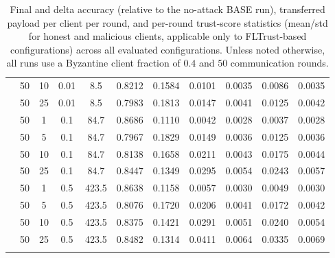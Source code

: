 \begin{longtable}{@{}l c c c c c c c c c c@{}}
	& 50 & 10 & 0.01 & 8.5 & 0.8212 & 0.1584 & 0.0101 & 0.0035 & 0.0086 & 0.0035 \\
	& 50 & 25 & 0.01 & 8.5 & 0.7983 & 0.1813 & 0.0147 & 0.0041 & 0.0125 & 0.0042 \\
	& 50 & 1 & 0.1 & 84.7 & 0.8686 & 0.1110 & 0.0042 & 0.0028 & 0.0037 & 0.0028 \\
	& 50 & 5 & 0.1 & 84.7 & 0.7967 & 0.1829 & 0.0149 & 0.0036 & 0.0125 & 0.0036 \\
	& 50 & 10 & 0.1 & 84.7 & 0.8138 & 0.1658 & 0.0211 & 0.0043 & 0.0175 & 0.0044 \\
	& 50 & 25 & 0.1 & 84.7 & 0.8447 & 0.1349 & 0.0295 & 0.0054 & 0.0243 & 0.0057 \\
	& 50 & 1 & 0.5 & 423.5 & 0.8638 & 0.1158 & 0.0057 & 0.0030 & 0.0049 & 0.0030 \\
	& 50 & 5 & 0.5 & 423.5 & 0.8076 & 0.1720 & 0.0206 & 0.0041 & 0.0172 & 0.0042 \\
	& 50 & 10 & 0.5 & 423.5 & 0.8375 & 0.1421 & 0.0291 & 0.0051 & 0.0240 & 0.0054 \\
	& 50 & 25 & 0.5 & 423.5 & 0.8482 & 0.1314 & 0.0411 & 0.0064 & 0.0335 & 0.0069 \\
	\caption{Final and delta accuracy (relative to the no-attack BASE run), transferred payload per client per round, and per-round trust-score statistics (mean/std for honest and malicious clients, applicable only to FLTrust-based configurations) across all evaluated configurations. Unless noted otherwise, all runs use a Byzantine client fraction of $0.4$ and $50$ communication rounds.}
	\label{tab:accuracy-summary}
\end{longtable}
